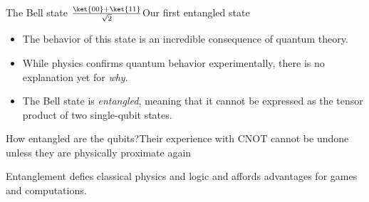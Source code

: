 \begin{frame}{The Bell state $\frac{\ket{00}+\ket{11}}{\sqrt{2}}$}{Our first entangled state}
\Vskip{-3.5em}\begin{itemize}
    \item<1-> The behavior of this state is an incredible consequence of quantum theory.
    \item<2-> While physics confirms quantum behavior experimentally, there is no explanation yet for \emph{why}.
    \item<3-> The Bell state is \emph{entangled}, meaning that it cannot be expressed as the tensor product of two single-qubit states.
\end{itemize}
    
\end{frame}

\begin{frame}{How entangled are the qubits?}{Their experience with CNOT cannot be undone unless they are physically proximate again}

\MedSkip{}
Entanglement defies classical physics and logic and affords advantages for games and computations.
    
\end{frame}

